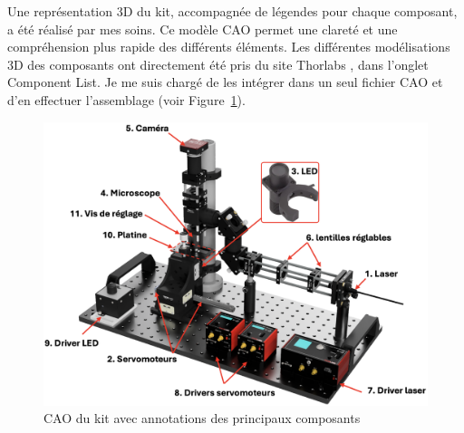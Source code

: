 \newpage
Une représentation 3D du kit, accompagnée de légendes pour chaque composant, a été réalisé par mes soins.\label{modelisation_3D} Ce modèle CAO permet une clareté et une compréhension plus rapide des différents éléments. Les différentes modélisations 3D des composants ont directement été pris du site Thorlabs \cite{portableOpticalTweezers}, dans l'onglet \guillemotleft Component List\guillemetright. Je me suis chargé de les intégrer dans un seul fichier CAO et d'en effectuer l'assemblage (voir Figure~\ref{kit_CAO_vierge_annote}).

\begin{figure}[H]
    \begin{center}
        \includegraphics[width=\textwidth]{assets/figures/Introduction/Kit_CAO_vierge_annote.png}
    \end{center}
    \caption{CAO du kit avec annotations des principaux composants}
    \label{kit_CAO_vierge_annote}
\end{figure}

